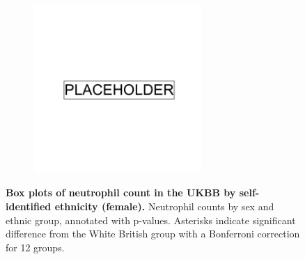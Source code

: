 \begin{figure}
    \centering
    \begin{subfigure}{\textwidth}
    \includegraphics[width=0.7\textwidth]{placeholder.png}
    \end{subfigure}
    \caption[Box plots of neutrophil count in the UKBB by self-identified ethnicity (female)]{\textbf{Box plots of neutrophil count in the UKBB by self-identified ethnicity (female).} Neutrophil counts by sex and ethnic group, annotated with p-values. Asterisks indicate significant difference from the White British group with a Bonferroni correction for 12 groups.}
    \label{fig:supp_box_neutrophill_f}
\end{figure}

\newpage

